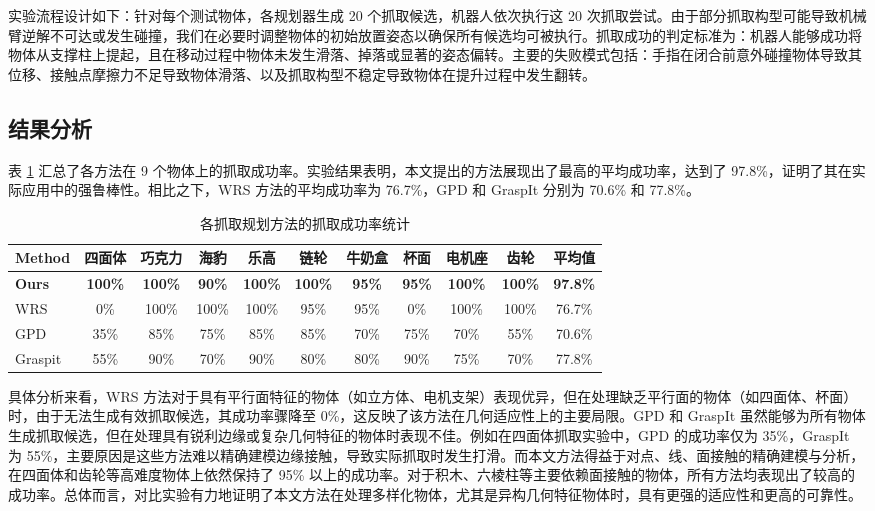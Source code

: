 实验流程设计如下：针对每个测试物体，各规划器生成 20 个抓取候选，机器人依次执行这 20 次抓取尝试。由于部分抓取构型可能导致机械臂逆解不可达或发生碰撞，我们在必要时调整物体的初始放置姿态以确保所有候选均可被执行。抓取成功的判定标准为：机器人能够成功将物体从支撑柱上提起，且在移动过程中物体未发生滑落、掉落或显著的姿态偏转。主要的失败模式包括：手指在闭合前意外碰撞物体导致其位移、接触点摩擦力不足导致物体滑落、以及抓取构型不稳定导致物体在提升过程中发生翻转。

\subsection{结果分析}
表 \ref{tab:statistical results} 汇总了各方法在 9 个物体上的抓取成功率。实验结果表明，本文提出的方法展现出了最高的平均成功率，达到了 97.8\%，证明了其在实际应用中的强鲁棒性。相比之下，WRS 方法的平均成功率为 76.7\%，GPD 和 GraspIt 分别为 70.6\% 和 77.8\%。

\begin{table}[t]
    \centering
    \small
    \setlength{\tabcolsep}{4pt}
    \caption{各抓取规划方法的抓取成功率统计}
    \label{tab:statistical results}
    \begin{threeparttable}
    \begin{tabular}{l|ccccccccc|c}
        \toprule
        \textbf{Method} & \textbf{四面体} & \textbf{巧克力} & \textbf{海豹} & \textbf{乐高} & \textbf{链轮} & \textbf{牛奶盒} & \textbf{杯面} & \textbf{电机座} & \textbf{齿轮} & \textbf{平均值} \\
        \midrule
        \textbf{Ours} & \textbf{100\%} & \textbf{100\%} & \textbf{90\%} & \textbf{100\%} & \textbf{100\%} & \textbf{95\%} & \textbf{95\%} & \textbf{100\%} & \textbf{100\%} & \textbf{97.8\%} \\
        WRS~\cite{wan2020planning} & 0\%   & 100\% & 100\% & 100\% & 95\%  & 95\% & 0\%  & 100\% & 100\% & 76.7\% \\
        GPD~\cite{ten2017grasp}& 35\%  & 85\%  & 75\%  & 85\%  & 85\%  & 70\% & 75\% & 70\%  & 55\%  & 70.6\% \\
        Graspit~\cite{miller_graspit_2021} & 55\%  & 90\%  & 70\%  & 90\%  & 80\%  & 80\% & 90\% & 75\%  & 70\%  & 77.8\% \\
        \bottomrule
    \end{tabular}
    \end{threeparttable}
\end{table}

具体分析来看，WRS 方法对于具有平行面特征的物体（如立方体、电机支架）表现优异，但在处理缺乏平行面的物体（如四面体、杯面）时，由于无法生成有效抓取候选，其成功率骤降至 0\%，这反映了该方法在几何适应性上的主要局限。GPD 和 GraspIt 虽然能够为所有物体生成抓取候选，但在处理具有锐利边缘或复杂几何特征的物体时表现不佳。例如在四面体抓取实验中，GPD 的成功率仅为 35\%，GraspIt 为 55\%，主要原因是这些方法难以精确建模边缘接触，导致实际抓取时发生打滑。而本文方法得益于对点、线、面接触的精确建模与分析，在四面体和齿轮等高难度物体上依然保持了 95\% 以上的成功率。对于积木、六棱柱等主要依赖面接触的物体，所有方法均表现出了较高的成功率。总体而言，对比实验有力地证明了本文方法在处理多样化物体，尤其是异构几何特征物体时，具有更强的适应性和更高的可靠性。

